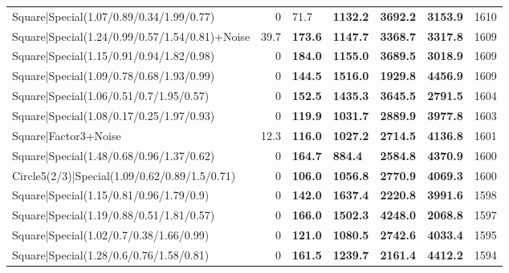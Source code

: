 \begin{tabular}{lrllllr}
 Square|Special(1.07/0.89/0.34/1.99/0.77)                      &             0   & 71.7           & \textbf{1132.2} & \textbf{3692.2} & \textbf{3153.9} &         1610 \\
 Square|Special(1.24/0.99/0.57/1.54/0.81)+Noise                &            39.7 & \textbf{173.6} & \textbf{1147.7} & \textbf{3368.7} & \textbf{3317.8} &         1609 \\
 Square|Special(1.15/0.91/0.94/1.82/0.98)                      &             0   & \textbf{184.0} & \textbf{1155.0} & \textbf{3689.5} & \textbf{3018.9} &         1609 \\
 Square|Special(1.09/0.78/0.68/1.93/0.99)                      &             0   & \textbf{144.5} & \textbf{1516.0} & \textbf{1929.8} & \textbf{4456.9} &         1609 \\
 Square|Special(1.06/0.51/0.7/1.95/0.57)                       &             0   & \textbf{152.5} & \textbf{1435.3} & \textbf{3645.5} & \textbf{2791.5} &         1604 \\
 Square|Special(1.08/0.17/0.25/1.97/0.93)                      &             0   & \textbf{119.9} & \textbf{1031.7} & \textbf{2889.9} & \textbf{3977.8} &         1603 \\
 Square|Factor3+Noise                                          &            12.3 & \textbf{116.0} & \textbf{1027.2} & \textbf{2714.5} & \textbf{4136.8} &         1601 \\
 Square|Special(1.48/0.68/0.96/1.37/0.62)                      &             0   & \textbf{164.7} & \textbf{884.4}  & \textbf{2584.8} & \textbf{4370.9} &         1600 \\
 Circle5(2/3)|Special(1.09/0.62/0.89/1.5/0.71)                 &             0   & \textbf{106.0} & \textbf{1056.8} & \textbf{2770.9} & \textbf{4069.3} &         1600 \\
 Square|Special(1.15/0.81/0.96/1.79/0.9)                       &             0   & \textbf{142.0} & \textbf{1637.4} & \textbf{2220.8} & \textbf{3991.6} &         1598 \\
 Square|Special(1.19/0.88/0.51/1.81/0.57)                      &             0   & \textbf{166.0} & \textbf{1502.3} & \textbf{4248.0} & \textbf{2068.8} &         1597 \\
 Square|Special(1.02/0.7/0.38/1.66/0.99)                       &             0   & \textbf{121.0} & \textbf{1080.5} & \textbf{2742.6} & \textbf{4033.4} &         1595 \\
 Square|Special(1.28/0.6/0.76/1.58/0.81)                       &             0   & \textbf{161.5} & \textbf{1239.7} & \textbf{2161.4} & \textbf{4412.2} &         1594 \\

\end{tabular}
